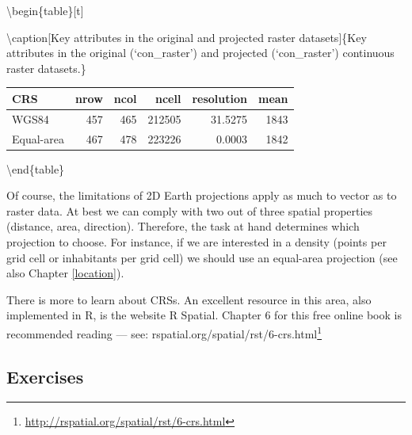 \documentclass[]{krantz}
\let\rmarkdownfootnote\footnote%
\def\footnote{\protect\rmarkdownfootnote}
\renewcommand{\href}[2]{#2\footnote{\url{#1}}}
\let\BeginKnitrBlock\begin \let\EndKnitrBlock\end
\begin{document}
\textbackslash{}begin\{table\}{[}t{]}

\textbackslash{}caption{[}Key attributes in the original and projected raster datasets{]}\{\label{tab:rastercrs}Key attributes in the original (`con\_raster') and projected (`con\_raster') continuous raster datasets.\}
\centering

\begin{tabular}{lrrrrr}
\toprule
CRS & nrow & ncol & ncell & resolution & mean\\
\midrule
WGS84 & 457 & 465 & 212505 & 31.5275 & 1843\\
Equal-area & 467 & 478 & 223226 & 0.0003 & 1842\\
\bottomrule
\end{tabular}

\textbackslash{}end\{table\}

\BeginKnitrBlock{rmdnote}
Of course, the limitations of 2D Earth projections apply as much to vector as to raster data.
At best we can comply with two out of three spatial properties (distance, area, direction).
Therefore, the task at hand determines which projection to choose.
For instance, if we are interested in a density (points per grid cell or inhabitants per grid cell) we should use an equal-area projection (see also Chapter \ref{location}).
\EndKnitrBlock{rmdnote}

There is more to learn about CRSs.
An excellent resource in this area, also implemented in R, is the website R Spatial.
Chapter 6 for this free online book is recommended reading --- see: \href{http://rspatial.org/spatial/rst/6-crs.html}{rspatial.org/spatial/rst/6-crs.html}

\hypertarget{exercises-4}{%
\subsection{Exercises}\label{exercises-4}}
\end{document}
